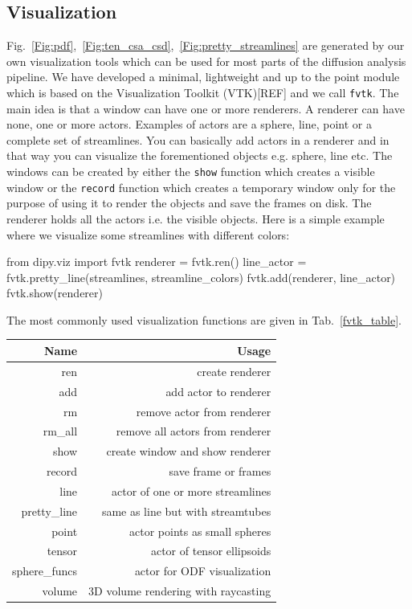 \documentclass{bioinfo}
\begin{document}
\subsection{Visualization}
Fig.~\ref{Fig:pdf},~\ref{Fig:ten_csa_csd},~\ref{Fig:pretty_streamlines}
are generated by
our own visualization tools which can be used for most parts of the diffusion
analysis pipeline. We have developed a minimal, lightweight and up to the point
module which is based on the Visualization Toolkit (VTK)[REF] and we call
\texttt{fvtk}. The main idea is that a window can have one or more renderers.
A renderer can have none, one or more actors. Examples of actors are a sphere,
line, point or a complete set of streamlines. You can basically add actors in a
renderer and in that way you can visualize the forementioned objects e.g.
sphere, line etc. The windows can
be created by either the \texttt{show} function which creates a visible window
or the \texttt{record} function which creates a temporary window only for the
purpose of using it to render the objects and save the frames on disk. The
renderer holds all the actors i.e. the visible objects. Here is a simple example
where we visualize some streamlines with different colors:
\begin{python}
from dipy.viz import fvtk
renderer = fvtk.ren()
line_actor = fvtk.pretty_line(streamlines,
                              streamline_colors)
fvtk.add(renderer, line_actor)
fvtk.show(renderer)
\end{python}
The most commonly used visualization functions are given in Tab.~\ref{fvtk_table}.

\begin{table}[th] 
{\begin{tabular}{rr} \hline
Name & Usage \\ \hline
ren & create renderer\\
add & add actor to renderer\\
rm  & remove actor from renderer \\
rm\_all & remove all actors from renderer \\
show & create window and show renderer \\
record & save frame or frames \\
line & actor of one or more streamlines \\
pretty\_line & same as line but with streamtubes \\
point & actor points as small spheres \\
tensor & actor of tensor ellipsoids \\
sphere\_funcs & actor for ODF visualization \\
volume & 3D volume rendering with raycasting \\
\hline
\end{tabular}}{}
\end{table}
\end{document}
